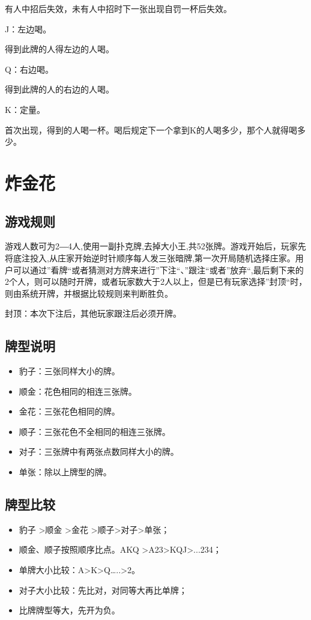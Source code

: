 \documentclass{ctexbook}
\begin{document}
有人中招后失效，未有人中招时下一张出现自罚一杯后失效。



J：左边喝。

得到此牌的人得左边的人喝。

Q：右边喝。

得到此牌的人的右边的人喝。

K：定量。

首次出现，得到的人喝一杯。喝后规定下一个拿到K的人喝多少，那个人就得喝多少。
\section{炸金花}
\subsection{游戏规则}
游戏人数可为2―4人,使用一副扑克牌,去掉大小王,共52张牌。游戏开始后，玩家先将底注投入,从庄家开始逆时针顺序每人发三张暗牌,第一次开局随机选择庄家。用户可以通过''看牌``或者猜测对方牌来进行''下注``、''跟注``或者''放弃``,最后剩下来的2个人，则可以随时开牌，或者玩家数大于2人以上，但是已有玩家选择''封顶``时，则由系统开牌，并根据比较规则来判断胜负。

封顶：本次下注后，其他玩家跟注后必须开牌。

\subsection{牌型说明}
\begin{itemize}
\item 豹子：三张同样大小的牌。
\item 顺金：花色相同的相连三张牌。
\item 金花：三张花色相同的牌。
\item 顺子：三张花色不全相同的相连三张牌。
\item 对子：三张牌中有两张点数同样大小的牌。
\item 单张：除以上牌型的牌。
\end{itemize}
\subsection{牌型比较}
\begin{itemize}
    \item 豹子 >顺金 >金花 >顺子>对子>单张；
    \item 顺金、顺子按照顺序比点。AKQ >A23>KQJ>...234；
    \item 单牌大小比较：A>K>Q…..>2。
    \item 对子大小比较：先比对，对同等大再比单牌；
    \item 比牌牌型等大，先开为负。
\end{itemize}
\end{document}
